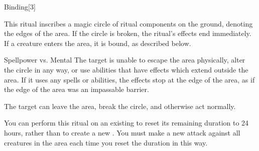\begin{spellsection}{Binding}[3]
    \begin{spellheader}
    \end{spellheader}
    \begin{spellcontent}
        \begin{spelltargetinginfo}
        \end{spelltargetinginfo}
        \begin{spelleffects}
            \spelleffect This ritual inscribes a magic circle of ritual components on the ground, denoting the edges of the area. If the circle is broken, the ritual's effects end immediately. If a creature enters the area, it is bound, as described below.
        \end{spelleffects}
    \end{spellcontent}
    \begin{spellsubcontent}
        \begin{spelleffects}
            \begin{spellattack}{Spellpower vs. Mental}
                \spellsuccess The target is unable to escape the area physically, alter the circle in any way, or use abilities that have effects which extend outside the area. If it uses any spells or abilities, the effects stop at the edge of the area, as if the edge of the area was an impassable barrier.

                \spellfailure The target can leave the area, break the circle, and otherwise act normally.
            \end{spellattack}

            \spelldur \durext
        \end{spelleffects}
    \end{spellsubcontent}
    \begin{spellfooter}
        \spellnotes You can perform this ritual on an existing  to reset its remaining duration to 24 hours, rather than to create a new . You must make a new attack against all creatures in the area each time you reset the duration in this way.


\end{spellfooter}
\end{spellsection}

